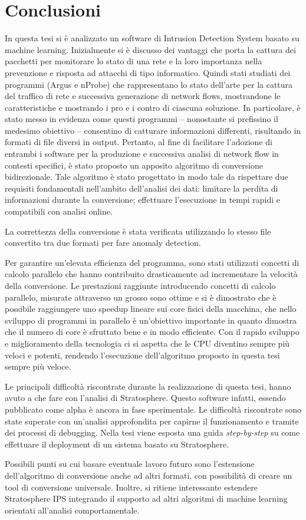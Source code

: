 \documentclass[../main.tex]{subfiles}
\begin{document}
\chapter{Conclusioni}
In questa tesi si è analizzato un software di Intrusion Detection System basato su machine learning. Inizialmente si è discusso dei vantaggi che porta la cattura dei pacchetti per monitorare lo stato di una rete e la loro importanza nella prevenzione e risposta ad attacchi di tipo informatico. Quindi stati studiati dei programmi (Argus e nProbe) che rappresentano lo stato dell'arte per la cattura del traffico di rete e successiva generazione di network flows, mostrandone le caratteristiche e mostrando i pro e i contro di ciascuna soluzione.
In particolare, è stato messo in evidenza come questi programmi -- nonostante si prefissino il medesimo obiettivo -- consentino di catturare informazioni differenti, risultando in formati di file diversi in output. Pertanto, al fine di facilitare l'adozione di entrambi i software per la produzione e successiva analisi di network flow in contesti specifici, è stato proposto un apposito algoritmo di conversione bidirezionale. Tale algoritmo è stato progettato in modo tale da rispettare due requisiti fondamentali nell'ambito dell'analisi dei dati: limitare la perdita di informazioni durante la conversione; effettuare l'esecuzione in tempi rapidi e compatibili con analisi online.

La correttezza della conversione è stata verificata utilizzando lo stesso file convertito tra due formati per fare anomaly detection.

Per garantire un'elevata efficienza del programma, sono stati utilizzati concetti di calcolo parallelo che hanno contribuito drasticamente ad incrementare la velocità della conversione. Le prestazioni raggiunte introducendo concetti di calcolo parallelo, misurate attraverso un grosso  sono ottime e si è dimostrato che è possibile raggiungere uno speedup lineare sui core fisici della macchina, che nello sviluppo di programmi in parallelo è un'obiettivo importante in quanto dimostra che il numero di core è sfruttato bene e in modo efficiente. Con il rapido sviluppo e miglioramento della tecnologia ci si aspetta che le CPU diventino sempre più veloci e potenti, rendendo l'esecuzione dell'algoritmo proposto in questa tesi sempre più veloce. 

Le principali difficoltà riscontrate durante la realizzazione di questa tesi, hanno avuto a che fare con l'analisi di Stratosphere. Questo software infatti, essendo pubblicato come alpha è ancora in fase sperimentale. Le difficoltà riscontrate sono state superate con un'analisi approfondita per capirne il funzionamento e tramite dei processi di debugging. Nella tesi viene esposta una guida \textit{step-by-step} su come effettuare il deployment di un sistema basato su Stratosphere.

Possibili punti su cui basare eventuale lavoro futuro sono l'estensione dell'algoritmo di conversione anche ad altri formati, con possibilità di creare un tool di conversione universale. Inoltre, si ritiene interessante estendere Stratosphere IPS integrando il supporto ad altri algoritmi di machine learning orientati all'analisi comportamentale.
\end{document}
